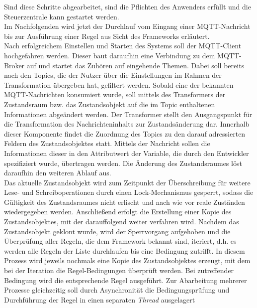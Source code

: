         Sind diese Schritte abgearbeitet, sind die Pflichten des Anwenders erfüllt und die Steuerzentrale kann gestartet werden. 
        \\
        Im Nachfolgenden wird jetzt der Durchlauf vom Eingang einer \acs{MQTT}-Nachricht bis zur Ausführung einer Regel aus Sicht des Frameworks 
        erläutert.
        \\
        \linebreak
        Nach erfolgreichem Einstellen und Starten des Systems soll der \acs{MQTT}-Client hochgefahren werden. Dieser baut daraufhin eine 
        Verbindung zu dem \acs{MQTT}-Broker auf und startet das Zuhören auf eingehende Themen. Dabei soll bereits nach den Topics,  
        die der Nutzer über die Einstellungen im Rahmen der Transformation übergeben hat, gefiltert werden. Sobald eine der bekannten 
        \acs{MQTT}-Nachrichten konsumiert wurde, soll mittels des Transformers der Zustandsraum bzw. das Zustandsobjekt 
        auf die im Topic enthaltenen Informationen abgeändert werden. Der Transformer stellt den Ausgangspunkt für die Transformation 
        des Nachrichteninhalts zur Zustandsänderung dar. Innerhalb dieser Komponente findet die Zuordnung 
        des Topics zu den darauf adressierten Feldern des Zustandsobjektes statt. Mittels der Nachricht sollen die Informationen dieser 
        in den Attributwert der Variable, die durch den Entwickler spezifiziert wurde, übertragen werden. Die Änderung des 
        Zustandsraumes löst daraufhin den weiteren Ablauf aus. 
        \\
        Das aktuelle Zustandsobjekt wird zum Zeitpunkt der Überschreibung für weitere Lese- und Schreiboperationen durch einen Lock-Mechanismus gesperrt, sodass 
        die Gültigkeit des Zustandsraumes nicht erlischt und nach wie vor reale Zuständen wiedergegeben werden. Anschließend erfolgt die 
        Erstellung einer Kopie des Zustandsobjektes, mit der 
        darauffolgend weiter verfahren wird. Nachdem das Zustandsobjekt geklont wurde, wird der Sperrvorgang aufgehoben und die 
        Überprüfung aller Regeln, die dem Framework bekannt sind, iteriert, d.h. es werden alle Regeln der Liste durchlaufen bis eine Bedingung zutrifft. In diesem Prozess 
        wird jeweils nochmals eine Kopie des Zustandsobjektes erzeugt, mit dem bei der Iteration die Regel-Bedingungen überprüft werden. 
        Bei zutreffender Bedingung wird die entsprechende Regel ausgeführt. Zur Abarbeitung mehrerer Prozesse 
        gleichzeitig soll durch Asynchronität die Bedingungsprüfung und Durchführung der Regel in einen separaten \textit{Thread} ausgelagert 
